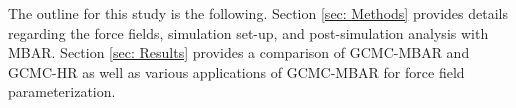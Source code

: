 \documentclass[journal=jced,manuscript=article]{achemso}
\begin{document}



The outline for this study is the following. Section \ref{sec: Methods} provides details regarding the force fields, simulation set-up, and post-simulation analysis with MBAR. Section \ref{sec: Results} provides a comparison of GCMC-MBAR and GCMC-HR as well as various applications of GCMC-MBAR for force field parameterization.
\end{document}
